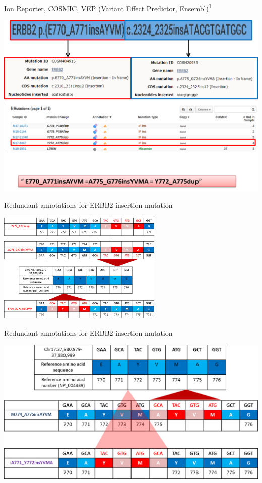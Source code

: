 \documentclass[
  ignorenonframetext,
]{beamer}
\begin{document}
\begin{frame}{Ion Reporter, COSMIC, VEP (Variant Effect Predictor,
Ensembl)\textsuperscript{1}}
\protect\hypertarget{ion-reporter-cosmic-vep-variant-effect-predictor-ensembl--__what_}{}

\includegraphics{assets/img/erbb2_cmc.png}

\end{frame}

\begin{frame}{Redundant annotations for ERBB2 insertion mutation}
\protect\hypertarget{redundant-annotations-for-erbb2-insertion-mutation}{}

\includegraphics[width=\textwidth,height=2.08333in]{assets/img/insertion.png}

\end{frame}

\begin{frame}{Redundant annotations for ERBB2 insertion mutation}
\protect\hypertarget{redundant-annotations-for-erbb2-insertion-mutation-1}{}

\includegraphics{assets/img/insertion_2.png}

\end{frame}
\end{document}
